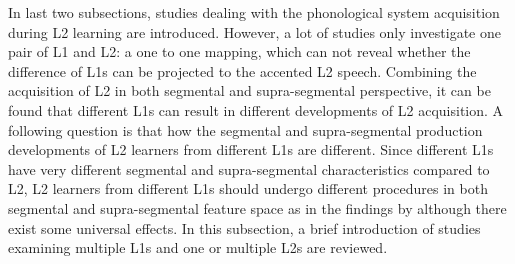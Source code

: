In last two subsections, studies dealing with the phonological system acquisition during L2 learning are introduced. However, a lot of studies only investigate one pair of L1 and L2: a one to one mapping, which can not reveal whether the difference of L1s can be projected to the accented L2 speech. Combining the acquisition of L2 in both segmental and supra-segmental perspective, it can be found that different L1s can result in different developments of L2 acquisition. A following question is that how the segmental and supra-segmental production developments of L2 learners from different L1s are different. Since different L1s have very different segmental and supra-segmental characteristics compared to L2, L2 learners from different L1s should undergo different procedures in both segmental and supra-segmental feature space as in the findings by \cite{ordin2015acquisition} although there exist some universal effects. In this subsection, a brief introduction of studies examining multiple L1s and one or multiple L2s are reviewed.
